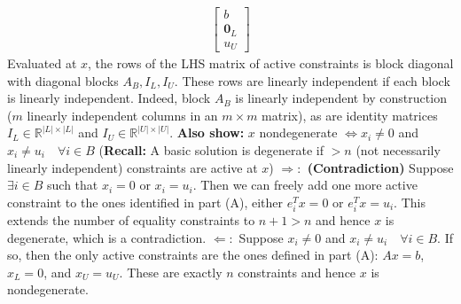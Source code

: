\documentclass[12pt]{exam}
\begin{document}
\begin{questions}
\begin{parts}
\begin{subparts}
\begin{align*}
\begin{bmatrix}
                    b \\ \textbf{0}_L \\ u_U
                \end{bmatrix}
            \end{align*}
            Evaluated at $x$, the rows of the LHS matrix of active constraints is block diagonal with diagonal blocks $A_B, I_L, I_U$. These rows are linearly independent if each block is linearly independent. Indeed, block $A_B$ is linearly independent by construction  ($m$ linearly independent columns in an $m \times m$ matrix), as are identity matrices $I_L\in\mathbb{R}^{|L|\times |L|}$ and $I_U \in\mathbb{R}^{|U|\times |U|}$.
            \subpart \textbf{Also show:} $x$ nondegenerate $\iff x_i \neq 0$ and $x_i \neq u_i \quad \forall i \in B$
            \newline(\textbf{Recall:} A basic solution is degenerate if $>n$ (not necessarily linearly independent) constraints are active at $x$)
            \newline\newline \textbf{$\Longrightarrow:$ (Contradiction)} Suppose $\exists i\in B$ such that $x_i = 0$ or $x_i = u_i$. Then we can freely add one more active constraint to the ones identified in part (A), either $e_i^Tx = 0$ or $e_i^Tx = u_i$. This extends the number of equality constraints to $n+1>n$ and hence $x$ is degenerate, which is a contradiction.
            \newline\newline \textbf{$\Longleftarrow:$} Suppose $x_i \neq 0$ and $x_i \neq u_i \quad \forall i \in B$. If so, then the only active constraints are the ones defined in part (A): $Ax = b$, $x_L = 0$, and $x_U = u_U$. These are exactly $n$ constraints and hence $x$ is nondegenerate.
        \end{subparts}
        

\end{parts}
\end{questions}
\end{document}

